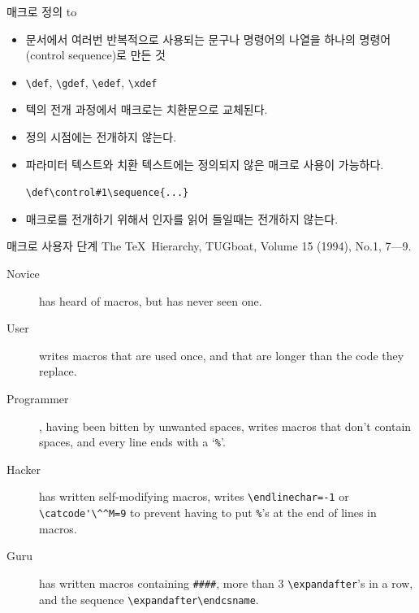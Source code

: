 \documentclass{beamer}
\begin{document}
%
\begin{frame}[fragile]{매크로 정의}
  \medskip
  \hbox to
  \smallskip
  \begin{itemize}
  \item 문서에서 여러번 반복적으로 사용되는 문구나 명령어의 나열을 하나의
    명령어(control sequence)로 만든 것
  \item \verb+\def+, \verb+\gdef+, \verb+\edef+, \verb+\xdef+
  \item 텍의 전개 과정에서 매크로는 치환문으로 교체된다.
  \item 정의 시점에는 전개하지 않는다.
  \item 파라미터 텍스트와 치환 텍스트에는 정의되지 않은 매크로 사용이 가능하다.
    
    \verb+\def\control#1\sequence{...}+
  \item 매크로를 전개하기 위해서 인자를 읽어 들일때는 전개하지 않는다.
  \end{itemize}
\end{frame}


%
\begin{frame}[fragile]{매크로 사용자 단계}
  The \TeX\ Hierarchy, TUGboat, Volume 15 (1994), No.1, 7---9.
  \begin{description}
  \item [Novice] has heard of macros, but has never seen one.
  \item [User] writes macros that are used once, and that are
    longer than the code they replace.
  \item [Programmer], having been bitten by unwanted spaces,
    writes macros that don't contain spaces, and every line ends with
    a `{\small\verb+%+}'.
  \item [Hacker] has written self-modifying macros, writes
    {\small\verb+\endlinechar=-1+} or {\small\verb+\catcode'\^^M=9+}
    to prevent having to put {\small\verb+%+}'s at the end of lines in macros.
  \item [Guru] has written macros containing {\small\verb+####+}, more than 3
    {\small\verb+\expandafter+}'s in a row, and the sequence
    {\small\verb+\expandafter\endcsname+}.
  \end{description}
\end{frame}
\end{document}
